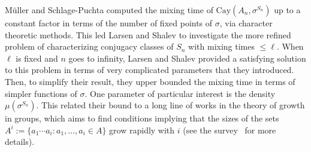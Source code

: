 \documentclass[11pt, letterpaper]{amsart}
\newtheorem{problem}[thm]{Problem}
\renewcommand\le{\leqslant}
\begin{document}
M\"{u}ller and Schlage-Puchta \cite{muller2007character} computed the mixing time of $\mathrm{Cay}(A_n, \sigma^{S_n})$ up to a constant factor in terms of the number of fixed points of $\sigma$, via character theoretic methods. This led Larsen and Shalev \cite{larsen2008characters} to investigate the more refined problem of characterizing conjugacy classes of $S_n$ with mixing times $\le \ell$.
When $\ell$ is fixed and $n$ goes to infinity, Larsen and Shalev \cite{larsen2008characters} provided a satisfying solution to this problem in terms of very complicated parameters that they introduced. Then, to simplify their result, they upper bounded the mixing time in terms of simpler functions of $\sigma$. One parameter of particular interest is the density $\mu(\sigma^{S_n})$. This related their bound to a long line of works in the theory of growth in groups, which aims to find conditions implying that the sizes of the sets $A^i:=\{a_1\cdots a_i: a_1,\ldots, a_i\in A\}$ grow rapidly with $i$ (see the survey~\cite{helfgott2015growth} for more details).

\end{document}
